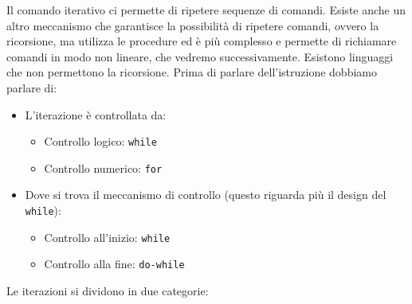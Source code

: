 \documentclass[a4paper]{article}
\begin{document}
Il comando iterativo ci permette di ripetere 
sequenze di comandi.
Esiste anche un altro meccanismo che garantisce la possibilità di ripetere
comandi, ovvero la ricorsione, ma utilizza le procedure ed è più complesso
e permette di richiamare comandi in modo non lineare, che vedremo successivamente.
Esistono linguaggi che non permettono la ricorsione.
Prima di parlare dell'istruzione dobbiamo parlare di:
\begin{itemize}
  \item L'iterazione è controllata da: 
  \begin{itemize}
    \item Controllo logico: \texttt{while} 
    \item Controllo numerico: \texttt{for}
  \end{itemize}
  \item Dove si trova il meccanismo di controllo (questo riguarda più il design del \texttt{while}):
  \begin{itemize}
    \item Controllo all'inizio: \texttt{while} 
    \item Controllo alla fine: \texttt{do-while}
  \end{itemize}
\end{itemize}
Le iterazioni si dividono in due categorie:
\end{document}

